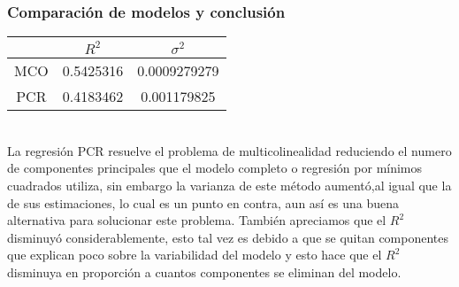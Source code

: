 \documentclass[12pt]{beamer}
\begin{document}
\begin{frame}
\frametitle{Comparación de modelos y conclusión}
\begin{center}
\begin{tabular}{|ccc|}
\hline 
 & $R^2$ & $\sigma^2$ \\ 
\hline 
MCO & 0.5425316 & 0.0009279279 \\ 
\hline 
PCR & 0.4183462 & 0.001179825 \\ 
\hline 
\end{tabular} 
\end{center}
~\\La regresión PCR resuelve el problema de multicolinealidad reduciendo el numero de componentes principales que el modelo completo o regresión por mínimos cuadrados utiliza, sin embargo la varianza de este método aumentó,al igual que la de sus estimaciones, lo cual es un punto en contra, aun así es una buena alternativa para solucionar este problema. También apreciamos que el $R^2$ disminuyó considerablemente, esto tal vez es debido a que se quitan componentes que explican poco sobre la variabilidad del modelo y esto hace que el $R^2$ disminuya en proporción a cuantos componentes se eliminan del modelo.
\end{frame}
\end{document}
